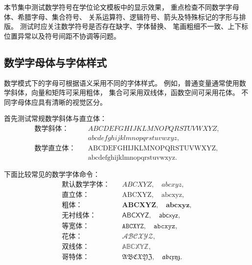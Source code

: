 本节集中测试数学符号在学位论文模板中的显示效果，
重点检查不同数学字母体、希腊字母、集合符号、
关系运算符、逻辑符号、箭头及特殊标记的字形与排版。
测试时应关注数学符号是否存在缺字、字体替换、
笔画粗细不一致、上下标位置异常以及符号间距不协调等问题。

\subsection{数学字母体与字体样式}
\label{subsec:symbol-fonts}

数学模式下的字母可根据语义采用不同的字体样式。
例如，普通变量通常使用数学斜体，向量和矩阵可采用粗体，
集合可采用双线体，函数空间可采用花体。
不同字母体应具有清晰的视觉区分。

首先测试常规数学斜体与直立体：
\begin{equation}
  \begin{aligned}
    \text{数学斜体：}\quad
      & ABCDEFGHIJKLMNOPQRSTUVWXYZ,\\
      & abcdefghijklmnopqrstuvwxyz,\\
    \text{数学直立体：}\quad
      & \mathrm{ABCDEFGHIJKLMNOPQRSTUVWXYZ},\\
      & \mathrm{abcdefghijklmnopqrstuvwxyz}.
  \end{aligned}
\end{equation}

下面比较常见的数学字体命令：
\begin{equation}
  \label{eq:test-symbol-alphabets}
  \begin{aligned}
    \text{默认数学字体：}\quad
      & ABCXYZ,\quad abcxyz,\\
    \text{直立体：}\quad
      & \mathrm{ABCXYZ},\quad \mathrm{abcxyz},\\
    \text{粗体：}\quad
      & \mathbf{ABCXYZ},\quad \mathbf{abcxyz},\\
    \text{无衬线体：}\quad
      & \mathsf{ABCXYZ},\quad \mathsf{abcxyz},\\
    \text{等宽体：}\quad
      & \mathtt{ABCXYZ},\quad \mathtt{abcxyz},\\
    \text{花体：}\quad
      & \mathcal{ABCXYZ},\\
    \text{双线体：}\quad
      & \mathbb{ABCXYZ},\\
    \text{哥特体：}\quad
      & \mathfrak{ABCXYZ},\quad \mathfrak{abcxyz}.
  \end{aligned}
\end{equation}

